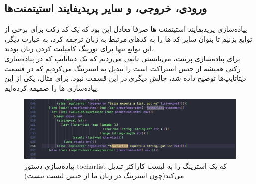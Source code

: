 \documentclass{article}
\begin{document}
\subsection{ورودی، خروجی، و سایر پریدیفایند استیتمنت‌ها}
پیاده‌سازی پریدیفایند استیتمنت ها صرفا معادل این بود که یک کد رکت برای برخی از توابع بزنیم تا بتوان سایر کد ها را به کد‌های مرتبط به زبان ترجمه کرد، به عبارت دیگر، این توابع تنها برای تورینگ کامپلیت کردن زبان بودند،.
\\
برای پیاده‌سازی پرینت، می‌بایستی تابعی می‌زدیم که یک دیتاتایپ که در پیاده‌سازی رکتی همیشه از جنس استراکت است را تبدیل به 
استرینگ می‌کردیم که در قسمت دیتاتایپ‌ها توضیح داده شد، چالش دیگری در این قسمت نبود، برای مثال، یکی از این پیاده‌سازی ها را ضمیمه کرده‌ایم:
        \begin{figure}[h]
        \centering
        \includegraphics[width=0.5\linewidth]{pics/tch.png}
        \caption{پیاده‌سازی دستور tocharlist که یک استرینگ را به لیست کاراکتر تبدیل می‌کند(چون استرینگ در زبان ما از جنس لیست نیست)}
\end{figure}
\FloatBarrier
\end{document}
